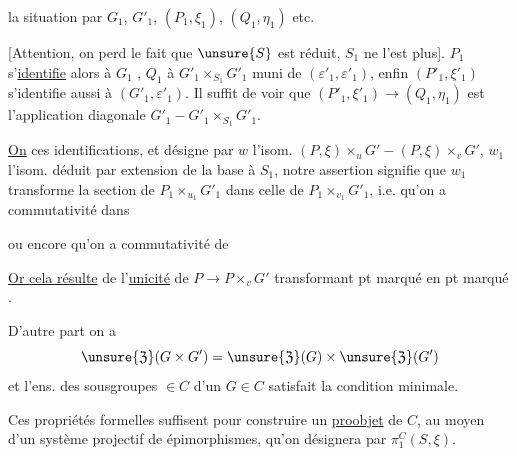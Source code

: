 la situation par $G_1$, $G'_1$, $(P_1,\xi_1)$, $(Q_1,\eta_1)$ etc.

[Attention, on perd le fait que $\unsure{S}$ est réduit, $S_1$ ne l'est plus].
$P_1$ s'\uline{identifie} alors à $G_1$
,
$Q_1$ à $G'_1\times_{S_1}G'_1$ muni de $(\varepsilon'_1,\varepsilon'_1)$,
 enfin $(P'_1,\xi'_1)$ s'identifie aussi à
$(G'_1,\varepsilon'_1)$.
Il suffit de voir que $(P'_1,\xi'_1)\to(Q_1,\eta_1)$ est
l'application diagonale $G'_1-G'_1\times_{S_1}G'_1$.

\uline{On}  ces identifications, et désigne par $w$ l'isom.
$(P,\xi)\times_u G'-(P,\xi)\times_v G'$,
$w_1$ l'isom. déduit par extension de la base à $S_1$,
notre assertion signifie que $w_1$ transforme la section
 de $P_1\times_{u_1}G'_1$ dans celle de
$P_1\times_{v_1}G'_1$, i.e. qu'on a commutativité dans


ou encore qu'on a commutativité de


\uline{Or cela résulte} de l'\uline{unicité} de $P\to P\times_vG'$
transformant  pt marqué en pt marqué .

D'autre part on a
\[
\unsure{\mathfrak{Z}}(G\times G')=
\unsure{\mathfrak{Z}}(G)\times\unsure{\mathfrak{Z}}(G')
\]
et l'ens. des sousgroupes $\in C$ d'un $G\in C$ satisfait la condition minimale.

Ces propriétés formelles suffisent pour construire un \uline{proobjet} de $C$,
au moyen d'un système projectif de épimorphismes, qu'on
 désignera par $\pi_1^C(S,\xi)$.

